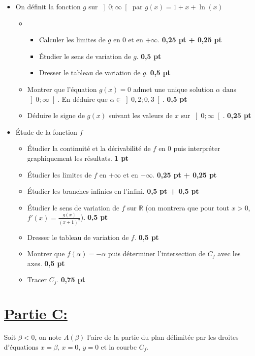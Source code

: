\documentclass[12pt]{article}
\begin{document}
\begin{itemize}
    \item[I.] On définit la fonction $g$ sur $\left]0 ; \infty\right[$ par $g(x) = 1 + x + \ln(x)$
    \begin{itemize}
        \item[1.] 
        \begin{itemize}
            \item[a)] Calculer les limites de $g$ en 0 et en $+\infty$. \textbf{0,25 pt + 0,25 pt}
            \item[b)] Étudier le sens de variation de $g$. \textbf{0,5 pt}
            \item[c)] Dresser le tableau de variation de $g$. \textbf{0,5 pt}
        \end{itemize}
        \item[2.] Montrer que l'équation $g(x) = 0$ admet une unique solution $\alpha$ dans $\left]0 ; \infty\right[$. En déduire que $\alpha \in \left]0,2 ; 0,3\right[$. \textbf{0,5 pt}
        \item[3.] Déduire le signe de $g(x)$ suivant les valeurs de $x$ sur $\left]0 ; \infty\right[$. \textbf{0,25 pt}
    \end{itemize}
    \item[II.] Étude de la fonction $f$
    \begin{itemize}
        \item[1.] Étudier la continuité et la dérivabilité de $f$ en 0 puis interpréter graphiquement les résultats. \textbf{1 pt}
        \item[2.] Étudier les limites de $f$ en $+\infty$ et en $-\infty$. \textbf{0,25 pt + 0,25 pt}
        \item[3.] Étudier les branches infinies en l'infini. \textbf{0,5 pt + 0,5 pt}
        \item[4.] Étudier le sens de variation de $f$ sur $\mathbb{R}$ (on montrera que pour tout $x > 0$, $f'(x) = \frac{g(x)}{(x + 1)^{2}}$). \textbf{0,5 pt}
        \item[5.] Dresser le tableau de variation de $f$. \textbf{0,5 pt}
        \item[6.] Montrer que $f(\alpha) = -\alpha$ puis déterminer l'intersection de $C_f$ avec les axes. \textbf{0,5 pt}
        \item[7.] Tracer $C_f$. \textbf{0,75 pt}
    \end{itemize}
\end{itemize}
\section*{\underline{Partie C:}}
Soit $\beta < 0$, on note $A(\beta)$ l'aire de la partie du plan délimitée par les droites d'équations $x = \beta$, $x = 0$, $y = 0$ et la courbe $C_f$.
\end{document}
